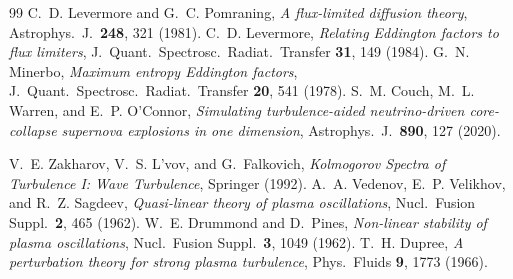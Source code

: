 \begin{thebibliography}{99}
C.~D. Levermore and G.~C. Pomraning,
\emph{A flux-limited diffusion theory},
Astrophys.\ J.\ \textbf{248}, 321 (1981).
C.~D. Levermore,
\emph{Relating Eddington factors to flux limiters},
J.\ Quant.\ Spectrosc.\ Radiat.\ Transfer \textbf{31}, 149 (1984).
G.~N. Minerbo,
\emph{Maximum entropy Eddington factors},
J.\ Quant.\ Spectrosc.\ Radiat.\ Transfer \textbf{20}, 541 (1978).
S.~M. Couch, M.~L. Warren, and E.~P. O'Connor,
\emph{Simulating turbulence-aided neutrino-driven core-collapse supernova
explosions in one dimension},
Astrophys.\ J.\ \textbf{890}, 127 (2020).

V.~E. Zakharov, V.~S. L'vov, and G.~Falkovich,
\emph{Kolmogorov Spectra of Turbulence I: Wave Turbulence},
Springer (1992).
A.~A. Vedenov, E.~P. Velikhov, and R.~Z. Sagdeev,
\emph{Quasi-linear theory of plasma oscillations},
Nucl.\ Fusion Suppl.\ \textbf{2}, 465 (1962).
W.~E. Drummond and D.~Pines,
\emph{Non-linear stability of plasma oscillations},
Nucl.\ Fusion Suppl.\ \textbf{3}, 1049 (1962).
T.~H. Dupree,
\emph{A perturbation theory for strong plasma turbulence},
Phys.\ Fluids \textbf{9}, 1773 (1966).


\end{thebibliography}
